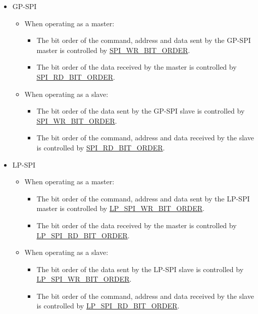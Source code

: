 \documentclass[main\_\_EN.tex]{subfiles}
\begin{document}
\begin{itemize}
    \item GP-SPI
    \begin{itemize}
        \item When operating as a master:
        \begin{itemize}
        \item The bit order of the command, address and data sent by the GP-SPI master is controlled by \hyperref[fielddesc:SPIWRBITORDER]{SPI\_WR\_BIT\_ORDER}.
        \item The bit order of the data received by the master is controlled by \hyperref[fielddesc:SPIRDBITORDER]{SPI\_RD\_BIT\_ORDER}.
        \end{itemize}
        \item When operating as a slave:
        \begin{itemize}
            \item The bit order of the data sent by the GP-SPI slave is controlled by \hyperref[fielddesc:SPIWRBITORDER]{SPI\_WR\_BIT\_ORDER}.
            \item The bit order of the command, address and data received by the slave is controlled by \hyperref[fielddesc:SPIRDBITORDER]{SPI\_RD\_BIT\_ORDER}.
        \end{itemize}
    \end{itemize}
    \item LP-SPI
    \begin{itemize}
        \item When operating as a master:
        \begin{itemize}
        \item The bit order of the command, address and data sent by the LP-SPI master is controlled by \hyperref[fielddesc:LPSPIWRBITORDER]{LP\_SPI\_WR\_BIT\_ORDER}.
        \item The bit order of the data received by the master is controlled by \hyperref[fielddesc:LPSPIRDBITORDER]{LP\_SPI\_RD\_BIT\_ORDER}.
        \end{itemize}
        \item When operating as a slave:
        \begin{itemize}
            \item The bit order of the data sent by the LP-SPI slave is controlled by \hyperref[fielddesc:LPSPIWRBITORDER]{LP\_SPI\_WR\_BIT\_ORDER}.
            \item The bit order of the command, address and data received by the slave is controlled by \hyperref[fielddesc:LPSPIRDBITORDER]{LP\_SPI\_RD\_BIT\_ORDER}.
        \end{itemize}
    \end{itemize}
\end{itemize}
\end{document}
